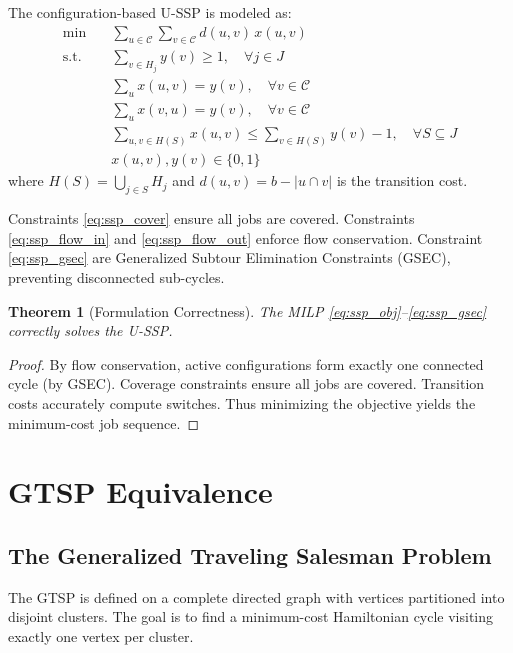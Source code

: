 \documentclass[12pt]{article}
\newtheorem{theorem}{Theorem}[section]
\begin{document}
	The configuration-based U-SSP is modeled as:
	\begin{align}
		\min \quad & \sum_{u \in \mathcal{C}} \sum_{v \in \mathcal{C}} d(u, v) \, x(u, v) \label{eq:ssp_obj}\\
		\text{s.t.} \quad & \sum_{v \in H_j} y(v) \ge 1, \quad \forall j \in J \label{eq:ssp_cover}\\
		& \sum_{u} x(u, v) = y(v), \quad \forall v \in \mathcal{C} \label{eq:ssp_flow_in}\\
		& \sum_{u} x(v, u) = y(v), \quad \forall v \in \mathcal{C} \label{eq:ssp_flow_out}\\
		& \sum_{u, v \in H(S)} x(u, v) \le \sum_{v \in H(S)} y(v) - 1, \quad \forall S \subseteq J \label{eq:ssp_gsec}\\
		& x(u, v), y(v) \in \{0, 1\}
	\end{align}
	where $H(S) = \bigcup_{j \in S} H_j$ and $d(u, v) = b - |u \cap v|$ is the transition cost.
	
	Constraints \eqref{eq:ssp_cover} ensure all jobs are covered. Constraints \eqref{eq:ssp_flow_in} and \eqref{eq:ssp_flow_out} enforce flow conservation. Constraint \eqref{eq:ssp_gsec} are Generalized Subtour Elimination Constraints (GSEC), preventing disconnected sub-cycles.
	
	\begin{theorem}[Formulation Correctness]
		The MILP \eqref{eq:ssp_obj}--\eqref{eq:ssp_gsec} correctly solves the U-SSP.
	\end{theorem}
	\begin{proof}
		By flow conservation, active configurations form exactly one connected cycle (by GSEC). Coverage constraints ensure all jobs are covered. Transition costs accurately compute switches. Thus minimizing the objective yields the minimum-cost job sequence.
	\end{proof}
	
	\section{GTSP Equivalence}
	
	\subsection{The Generalized Traveling Salesman Problem}
	
	The GTSP is defined on a complete directed graph with vertices partitioned into disjoint clusters. The goal is to find a minimum-cost Hamiltonian cycle visiting exactly one vertex per cluster.
	
\end{document}
